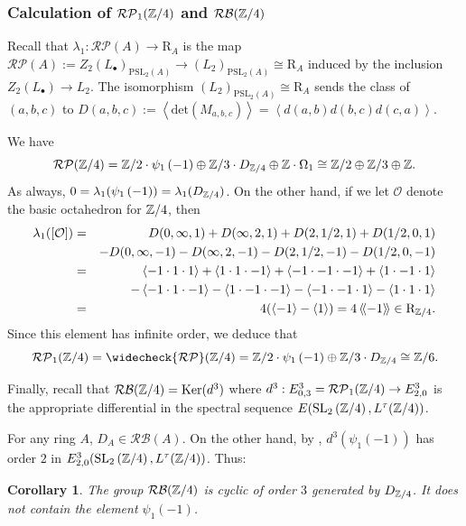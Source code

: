 \documentclass[12pt]{amsart}
\newtheorem{cor}[lem]{Corollary}
\theoremstyle{definition}
\newcommand{\Z}{\Bbb{Z}}
\newcommand{\oct}{\mathcal{O}}%
\newcommand{\scyc}[1]{\left[ #1 \right]} %
\newcommand{\spl}[2]{\operatorname{SL}_{#1}\left(#2\right)}
\newcommand{\pspl}[2]{\mathrm{PSL}_{#1}(#2)}
\newcommand{\rpb}[1]{\mathcal{RP}(#1)}%
\newcommand{\rpbker}[1]{\mathcal{RP}_1(#1)}%
\newcommand{\crpb}[1]{\widecheck{\mathcal{RP}}(#1)}
\newcommand{\rbl}[1]{{\mathcal{RB}}(#1)}%
\newcommand{\suss}[2]{\psi_{#1}\left( #2\right)}
\newcommand{\cconst}[1]{D_{#1}}
\newcommand{\<}{\langle}
\renewcommand{\>}{\rangle}
\renewcommand{\ker}[1]{\mathrm{Ker}(#1)}
\newcommand{\sgr}[1]{\mathrm{R}_{#1}}%
\newcommand{\an}[1]{\left\langle{#1}\right\rangle}
\newcommand{\pf}[1]{\left\langle\!\left\langle{#1}\right\rangle\!\right\rangle}
\begin{document}
\subsubsection{Calculation of $\rpbker{\Z/4}$ and $\rbl{\Z/4}$}  
Recall that $\lambda_1:\rpb{A}\to \sgr{A}$ is the map $\rpb{A}:=Z_2(L_\bullet)_{\pspl{2}{A}}\to (L_2)_{\pspl{2}{A}}\cong\sgr{A}$ 
induced by the inclusion $Z_2(L_\bullet)\to L_2$. The isomorphism $ (L_2)_{\pspl{2}{A}}\cong\sgr{A}$ sends the class of $(a,b,c)$ to $D(a,b,c):=\an{\mathrm{det}(M_{a,b,c})}=
\an{d(a,b)d(b,c)d(c,a)}$.

We have 
\[
\rpb{\Z/4}=\Z/2\cdot\suss{1}{-1}\oplus \Z/3\cdot \cconst{\Z/4}\oplus \Z\cdot \Omega_1\cong \Z/2\oplus\Z/3\oplus \Z.
\]
As always, $0=\lambda_1(\suss{1}{-1})=\lambda_1(\cconst{\Z/4})$. On the other hand, if we let $\oct$ denote the basic octahedron for $\Z/4$, then
\begin{eqnarray*}
\lambda_1(\scyc{\oct})&=& D(0,\infty,1)+D(\infty,2,1)+D(2,1/2,1)+D(1/2,0,1)\\
&&-D(0,\infty,-1)-D(\infty,2,-1)-D(2,1/2,-1)-D(1/2,0,-1)\\
&=& \an{-1\cdot 1\cdot 1}+\an{1\cdot 1\cdot -1}+\an{-1\cdot -1\cdot -1}+\an{1\cdot -1\cdot 1}\\
&&-\an{-1\cdot 1\cdot -1}-\an{1\cdot -1\cdot -1}-\an{-1\cdot -1\cdot 1}-\an{1\cdot 1\cdot 1}\\
&=& 4(\an{-1}-\an{1})=4\pf{-1}\in \sgr{\Z/4}.
\end{eqnarray*}
Since this element has infinite order, we deduce that 
\[
\rpbker{\Z/4}=\crpb{\Z/4}=\Z/2\cdot\suss{1}{-1}\oplus \Z/3\cdot \cconst{\Z/4}\cong \Z/6.
\]


Finally, recall that $\rbl{\Z/4}=\ker{d^3}$ where 
 $d^3:E^3_{0,3}=\rpbker{\Z/4}\to E^3_{2,0}$ is the appropriate differential in the spectral sequence $E(\spl{2}{\Z/4},L^\tau(\Z/4))$.

For any ring $A$, $\cconst{A}\in\rbl{A}$. On the other hand, by \cite[Lemma 5.8, Lemma A.12]{hut:bloch1}, $d^3(\suss{1}{-1})$ has order $2$ in $E^3_{2,0}(\spl{2}{\Z/4},L^\tau(\Z/4))$. Thus:
\begin{cor} \label{cor:rblz4} The group  $\rbl{\Z/4}$ is cyclic of order $3$ generated by $\cconst{\Z/4}$. It does not contain the element $\suss{1}{-1}$.
\end{cor}
\end{document}
